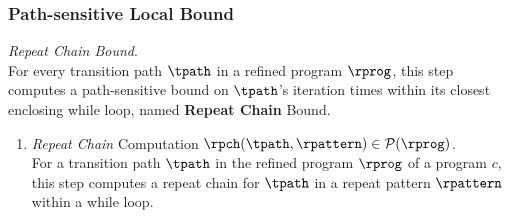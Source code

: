 \subsubsection{Path-sensitive Local Bound}
%
\emph{Repeat Chain Bound}.
  \\
  For every transition path $\tpath$ in a refined program $\rprog$,
  this step computes a path-sensitive
  bound on $\tpath$'s iteration times within its closest enclosing while loop, named \textbf{Repeat Chain} Bound.

  \begin{enumerate}
\item \emph{Repeat Chain} Computation $\rpch(\tpath, \rpattern) \in \mathcal{P}(\rprog)$.
\\
For a transition path $\tpath$ in the refined program $\rprog$ of a program $c$, 
this step computes a repeat chain for $\tpath$ in a repeat pattern $\rpattern$
within a while loop.

\end{enumerate}
